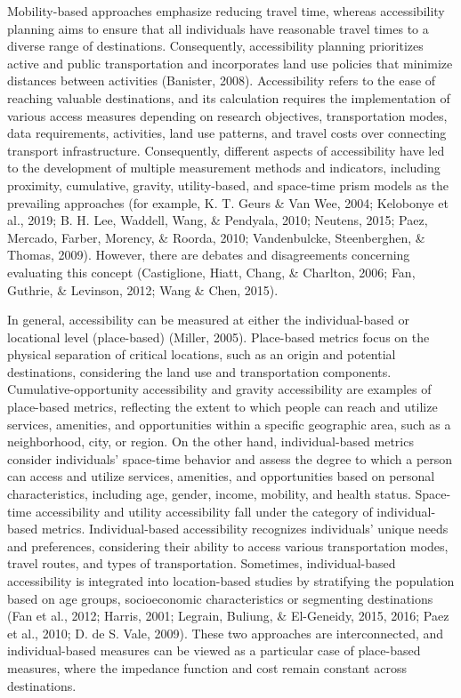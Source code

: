 \documentclass[12pt,twoside]{reedthesis}
\begin{document}
Mobility-based approaches emphasize reducing travel time, whereas accessibility planning aims to ensure that all individuals have reasonable travel times to a diverse range of destinations. Consequently, accessibility planning prioritizes active and public transportation and incorporates land use policies that minimize distances between activities (Banister, 2008). Accessibility refers to the ease of reaching valuable destinations, and its calculation requires the implementation of various access measures depending on research objectives, transportation modes, data requirements, activities, land use patterns, and travel costs over connecting transport infrastructure. Consequently, different aspects of accessibility have led to the development of multiple measurement methods and indicators, including proximity, cumulative, gravity, utility-based, and space-time prism models as the prevailing approaches (for example, K. T. Geurs \& Van Wee, 2004; Kelobonye et al., 2019; B. H. Lee, Waddell, Wang, \& Pendyala, 2010; Neutens, 2015; Paez, Mercado, Farber, Morency, \& Roorda, 2010; Vandenbulcke, Steenberghen, \& Thomas, 2009). However, there are debates and disagreements concerning evaluating this concept (Castiglione, Hiatt, Chang, \& Charlton, 2006; Fan, Guthrie, \& Levinson, 2012; Wang \& Chen, 2015).

In general, accessibility can be measured at either the individual-based or locational level (place-based) (Miller, 2005). Place-based metrics focus on the physical separation of critical locations, such as an origin and potential destinations, considering the land use and transportation components. Cumulative-opportunity accessibility and gravity accessibility are examples of place-based metrics, reflecting the extent to which people can reach and utilize services, amenities, and opportunities within a specific geographic area, such as a neighborhood, city, or region. On the other hand, individual-based metrics consider individuals' space-time behavior and assess the degree to which a person can access and utilize services, amenities, and opportunities based on personal characteristics, including age, gender, income, mobility, and health status. Space-time accessibility and utility accessibility fall under the category of individual-based metrics. Individual-based accessibility recognizes individuals' unique needs and preferences, considering their ability to access various transportation modes, travel routes, and types of transportation. Sometimes, individual-based accessibility is integrated into location-based studies by stratifying the population based on age groups, socioeconomic characteristics or segmenting destinations (Fan et al., 2012; Harris, 2001; Legrain, Buliung, \& El-Geneidy, 2015, 2016; Paez et al., 2010; D. de S. Vale, 2009). These two approaches are interconnected, and individual-based measures can be viewed as a particular case of place-based measures, where the impedance function and cost remain constant across destinations.
\end{document}
